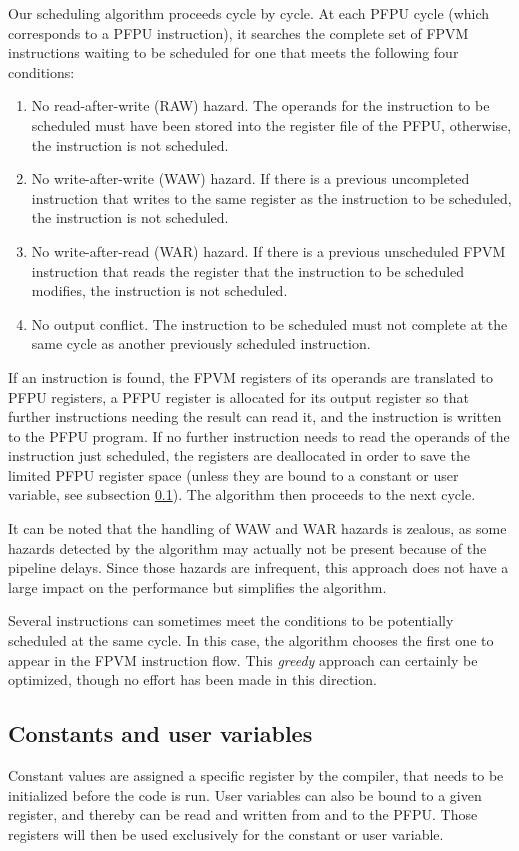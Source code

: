 \documentclass[a4paper,11pt]{kthesis}
\begin{document}
Our scheduling algorithm proceeds cycle by cycle. At each PFPU cycle (which corresponds to a PFPU instruction), it searches the complete set of FPVM instructions waiting to be scheduled for one that meets the following four conditions:
\begin{enumerate}
\item No read-after-write (RAW) hazard. The operands for the instruction to be scheduled must have been stored into the register file of the PFPU, otherwise, the instruction is not scheduled.
\item No write-after-write (WAW) hazard. If there is a previous uncompleted instruction that writes to the same register as the instruction to be scheduled, the instruction is not scheduled.
\item No write-after-read (WAR) hazard. If there is a previous unscheduled FPVM instruction that reads the register that the instruction to be scheduled modifies, the instruction is not scheduled.
\item No output conflict. The instruction to be scheduled must not complete at the same cycle as another previously scheduled instruction.
\end{enumerate}
If an instruction is found, the FPVM registers of its operands are translated to PFPU registers, a PFPU register is allocated for its output register so that further instructions needing the result can read it, and the instruction is written to the PFPU program. If no further instruction needs to read the operands of the instruction just scheduled, the registers are deallocated in order to save the limited PFPU register space (unless they are bound to a constant or user variable, see subsection \ref{subsec:constparam}). The algorithm then proceeds to the next cycle.

It can be noted that the handling of WAW and WAR hazards is zealous, as some hazards detected by the algorithm may actually not be present because of the pipeline delays. Since those hazards are infrequent, this approach does not have a large impact on the performance but simplifies the algorithm.

Several instructions can sometimes meet the conditions to be potentially scheduled at the same cycle. In this case, the algorithm chooses the first one to appear in the FPVM instruction flow. This \textit{greedy} approach can certainly be optimized, though no effort has been made in this direction.

\subsection{Constants and user variables}
\label{subsec:constparam}
Constant values are assigned a specific register by the compiler, that needs to be initialized before the code is run. User variables can also be bound to a given register, and thereby can be read and written from and to the PFPU. Those registers will then be used exclusively for the constant or user variable.
\end{document}
